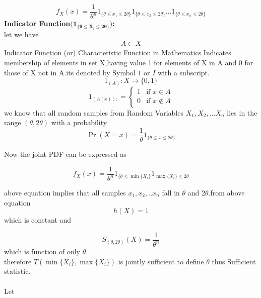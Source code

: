 \documentclass[journal,12pt,twocolumn]{IEEEtran}
\begin{document}
\begin{equation}
    f_X(x)=\frac{1}{\theta^n}1_{\{\theta\leq x_1\leq 2\theta\}}1_{\{\theta\leq x_2 \leq2\theta\}}...1_{\{\theta\leq x_n \leq2\theta\}}
\end{equation}
\textbf{Indicator Function$(\boldsymbol{1_{\{\theta\leq X_i\leq 2\theta\}})}$:}\\
let we have 
\begin{align}
    A\subset X
\end{align}
Indicator Function (or) Characteristic Function in Mathematics Indicates membership of elements in set X,having value 1 for elements of X in A and 0 for those of X not in A.its denoted by Symbol $1$ or $I$ with a subscript.
\begin{equation}
    1_{(A)}:X\to \{0,1\}
\end{equation}
\begin{equation}
    1_{(A(x)):}=
    \begin{cases}
       1 & \text{if $x \in A$} \\
       0 & \text{if $x\notin A$}
    \end{cases}
\end{equation}
we know that all random samples from Random Variables $X_1,X_2,...X_n$ lies in the range $(\theta,2\theta)$ with a probability 
\begin{equation}
    \Pr{(X=x)}=\frac{1}{\theta}1_{\{\theta\leq x\leq 2\theta\}}
\end{equation}

Now the joint PDF can be expressed as

\begin{equation}
    f_X(x)=\frac{1}{\theta^n}1_{\{\theta\leq \min\{X_i\}}1_{\max\{ X_i\}\leq2\theta}
\end{equation}

above equation implies that all samples $x_1,x_2,..x_n$ fall in $\theta$ and 2$\theta$.from above equation 
\begin{equation}
    h(X)=1
\end{equation}
 which is constant and
 
\begin{equation}
    S_{(\theta,2\theta)}(X)=\frac{1}{\theta^n}
\end{equation}
which is function of only $\theta$.\\
therefore $T(\min\{X_i\},\max\{X_i\})$ is jointly sufficient to define $\theta$ thus Sufficient statistic.\\ \\
Let 
\end{document}
